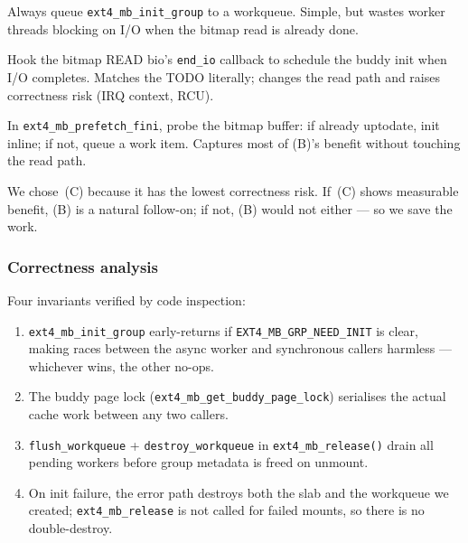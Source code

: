 \documentclass[12pt,a4paper]{article}
\begin{document}
\begin{description}[leftmargin=*]
  \item[A: Simple offload.] Always queue \texttt{ext4\_mb\_init\_group}
        to a workqueue.  Simple, but wastes worker threads blocking
        on I/O when the bitmap read is already done.
  \item[B: True TODO intent.] Hook the bitmap READ bio's
        \texttt{end\_io} callback to schedule the buddy init when I/O
        completes.  Matches the TODO literally; changes the read path
        and raises correctness risk (IRQ context, RCU).
  \item[C: Opportunistic hybrid \textit{(chosen)}.] In
        \texttt{ext4\_mb\_prefetch\_fini}, probe the bitmap buffer: if
        already uptodate, init inline; if not, queue a work item.
        Captures most of (B)'s benefit without touching the read path.
\end{description}

We chose~(C) because it has the lowest correctness risk.  If~(C)
shows measurable benefit, (B) is a natural follow-on; if not, (B)
would not either --- so we save the work.

\subsubsection{Correctness analysis}

Four invariants verified by code inspection:

\begin{enumerate}[leftmargin=*]
  \item \texttt{ext4\_mb\_init\_group} early-returns if
        \texttt{EXT4\_MB\_GRP\_NEED\_INIT} is clear, making races
        between the async worker and synchronous callers harmless ---
        whichever wins, the other no-ops.
  \item The buddy page lock (\texttt{ext4\_mb\_get\_buddy\_page\_lock})
        serialises the actual cache work between any two callers.
  \item \texttt{flush\_workqueue} + \texttt{destroy\_workqueue} in
        \texttt{ext4\_mb\_release()} drain all pending workers before
        group metadata is freed on unmount.
  \item On init failure, the error path destroys both the slab and
        the workqueue we created; \texttt{ext4\_mb\_release} is not
        called for failed mounts, so there is no double-destroy.
\end{enumerate}
\end{document}
